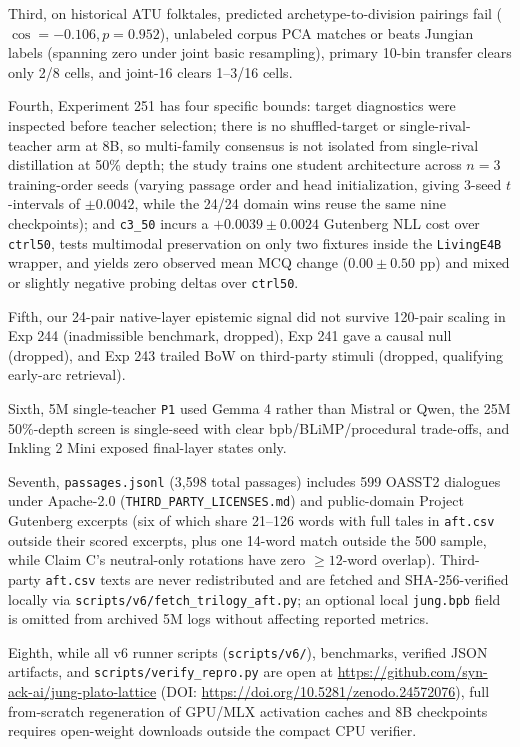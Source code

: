 \documentclass[conference]{IEEEtran}
\begin{document}
Third, on historical ATU folktales, predicted archetype-to-division pairings fail ($\cos=-0.106, p=0.952$), unlabeled corpus PCA matches or beats Jungian labels (spanning zero under joint basic resampling), primary 10-bin transfer clears only 2/8 cells, and joint-16 clears 1--3/16 cells.

Fourth, Experiment 251 has four specific bounds: target diagnostics were inspected before teacher selection; there is no shuffled-target or single-rival-teacher arm at 8B, so multi-family consensus is not isolated from single-rival distillation at 50\% depth; the study trains one student architecture across $n=3$ training-order seeds (varying passage order and head initialization, giving 3-seed $t$-intervals of $\pm0.0042$, while the 24/24 domain wins reuse the same nine checkpoints); and \texttt{c3\_50} incurs a $+0.0039\pm0.0024$ Gutenberg NLL cost over \texttt{ctrl50}, tests multimodal preservation on only two fixtures inside the \texttt{LivingE4B} wrapper, and yields zero observed mean MCQ change ($0.00\pm0.50$ pp) and mixed or slightly negative probing deltas over \texttt{ctrl50}.

Fifth, our 24-pair native-layer epistemic signal did not survive 120-pair scaling in Exp 244 (inadmissible benchmark, dropped), Exp 241 gave a causal null (dropped), and Exp 243 trailed BoW on third-party stimuli (dropped, qualifying early-arc retrieval).

Sixth, 5M single-teacher \texttt{P1} used Gemma 4 rather than Mistral or Qwen, the 25M 50\%-depth screen is single-seed with clear bpb/BLiMP/procedural trade-offs, and Inkling 2 Mini exposed final-layer states only.

Seventh, \texttt{passages.jsonl} (3,598 total passages) includes 599 OASST2 dialogues under Apache-2.0 (\texttt{THIRD\_PARTY\_LICENSES.md}) and public-domain Project Gutenberg excerpts (six of which share 21--126 words with full tales in \texttt{aft.csv} outside their scored excerpts, plus one 14-word match outside the 500 sample, while Claim C's neutral-only rotations have zero $\ge 12$-word overlap). Third-party \texttt{aft.csv} texts are never redistributed and are fetched and SHA-256-verified locally via \texttt{scripts/v6/fetch\_trilogy\_aft.py}; an optional local \texttt{jung.bpb} field is omitted from archived 5M logs without affecting reported metrics.

Eighth, while all v6 runner scripts (\texttt{scripts/v6/}), benchmarks, verified JSON artifacts, and \texttt{scripts/verify\_repro.py} are open at \url{https://github.com/syn-ack-ai/jung-plato-lattice} (DOI: \url{https://doi.org/10.5281/zenodo.24572076}), full from-scratch regeneration of GPU/MLX activation caches and 8B checkpoints requires open-weight downloads outside the compact CPU verifier.
\end{document}
